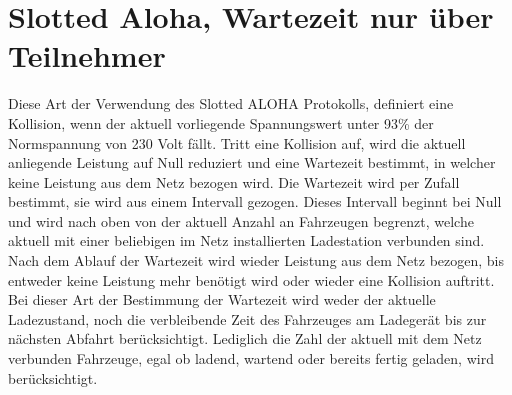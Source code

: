 \section{Slotted Aloha, Wartezeit nur über Teilnehmer}
\label{cap:background_sec:SA_participants}
Diese Art der Verwendung des Slotted ALOHA Protokolls, definiert eine Kollision, wenn der aktuell vorliegende Spannungswert unter 93\% der Normspannung von 230 Volt fällt. Tritt eine Kollision auf, wird die aktuell anliegende Leistung auf Null reduziert und eine Wartezeit bestimmt, in welcher keine Leistung aus dem Netz bezogen wird. Die Wartezeit wird per Zufall bestimmt, sie wird aus einem Intervall gezogen. Dieses Intervall beginnt  bei Null und wird nach oben von der aktuell Anzahl an Fahrzeugen begrenzt, welche aktuell mit einer beliebigen im Netz installierten Ladestation verbunden sind. Nach dem Ablauf der Wartezeit wird wieder Leistung aus dem Netz bezogen, bis entweder keine Leistung mehr benötigt wird oder wieder eine Kollision auftritt.
Bei dieser Art der Bestimmung der Wartezeit wird weder der aktuelle Ladezustand, noch die verbleibende Zeit des Fahrzeuges am Ladegerät bis zur nächsten Abfahrt berücksichtigt. Lediglich die Zahl der aktuell mit dem Netz verbunden Fahrzeuge, egal ob ladend, wartend oder bereits fertig geladen, wird berücksichtigt.

